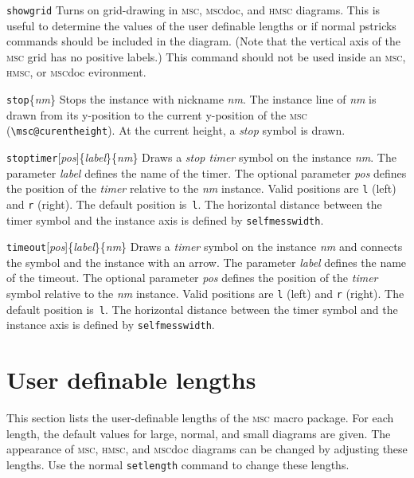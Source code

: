 \documentclass[a4paper]{article}
\newcommand{\cmd}[1]{\texttt{\bslash #1}}
\newcommand{\acro}[1]{{\scshape\lowercase{#1}}}
\newcommand\MSC{\acro{MSC}}
\newcommand\HMSC{\acro{HMSC}}
\newcommand{\MSCdoc}{\MSC{}doc}
\newcommand{\mscpack}{\MSC{} macro package}
\newcommand{\opt}[1]{[#1]}
\newenvironment{defs}{%
  \begin{list}{}%
              {\setlength{\labelwidth}{0pt}%
               \setlength{\labelsep}{1em}%
               \setlength{\leftmargin}{1em}%
               \setlength{\parsep}{1ex}%
               \setlength{\listparindent}{0pt}%
               \setlength{\rightmargin}{0pt}%
               \renewcommand{\makelabel}[1]{##1}%
               \raggedright%
              }%
  }{%
  \end{list}}
\begin{document}
\begin{defs}
\item[\cmd{showgrid}] Turns on grid-drawing in \MSC, \MSCdoc, and \HMSC{}
diagrams. This is useful to determine the values of the user definable
lengths or if normal \textsf{pstricks} commands should be included in
the diagram. (Note that the vertical axis of the \MSC{} grid has no positive
labels.) This command should not be used inside an \MSC,
\HMSC, or \MSCdoc{} evironment.

\item[\cmd{stop}\{\emph{nm}\}] Stops the instance with nickname
\emph{nm}. The instance line of \emph{nm} is drawn from its y-position
to the current y-position of the \MSC{} (\verb|\msc@curentheight|). At
the current height, a \emph{stop} symbol is drawn.

\item[\cmd{stoptimer}\opt{\emph{pos}}\{\emph{label}\}\{\emph{nm}\}]
Draws a \emph{stop timer} symbol on the instance \emph{nm}. The
parameter \emph{label} defines the name of the timer. The optional
parameter \emph{pos} defines the position of the \emph{timer} relative
to the \emph{nm} instance. Valid positions are \verb|l| (left) and
\verb|r| (right). The default position is~\verb|l|. The horizontal
distance between the timer symbol and the instance axis is defined by
\verb+selfmesswidth+.

\item[\cmd{timeout}\opt{\emph{pos}}\{\emph{label}\}\{\emph{nm}\}]
Draws a \emph{timer} symbol on the instance \emph{nm} and connects the
symbol and the instance with an arrow. The parameter \emph{label}
defines the name of the timeout. The optional parameter \emph{pos}
defines the position of the \emph{timer} symbol relative to the
\emph{nm} instance. Valid positions are \verb|l| (left) and \verb|r|
(right). The default position is~\verb|l|. The horizontal distance
between the timer symbol and the instance axis is defined by
\verb+selfmesswidth+.

\end{defs}


\section{User definable lengths}

This section lists the user-definable lengths of the \mscpack. For
each length, the default values for large, normal, and small diagrams
are given. The appearance of \MSC, \HMSC, and \MSCdoc{} diagrams can be
changed by adjusting these lengths. Use the normal \cmd{setlength}
command to change these lengths.
\end{document}
